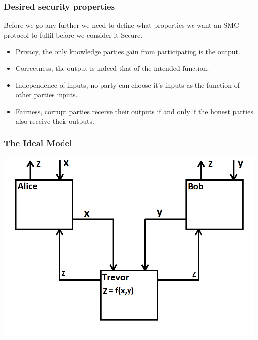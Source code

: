 \documentclass{beamer}
\begin{document}
	\begin{frame}
		\frametitle{Desired security properties}

		Before we go any further we need to define what properties we want an SMC protocol to fulfil before we consider it Secure.
		
		\begin{itemize}
			\item Privacy, the only knowledge parties gain from participating is the output.
			\item Correctness, the output is indeed that of the intended function.
			\item Independence of inputs, no party can choose it's inputs as the function of other parties inputs.
			\item Fairness, corrupt parties receive their outputs if and only if the honest parties also receive their outputs.
		\end{itemize}

	\end{frame}


	\begin{frame}
		\frametitle{The Ideal Model}

		\includegraphics[scale=0.6]{Images/IdealModel}
	\end{frame}
\end{document}
